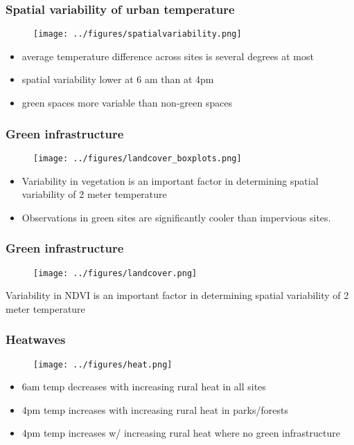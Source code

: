 \documentclass[aspectratio=169, 10pt]{beamer}
\begin{document}
\begin{frame}
\frametitle{Spatial variability of urban temperature}
\begin{figure}
\texttt{[image: ../figures/spatialvariability.png]}
\end{figure}
\begin{itemize}
\item average temperature difference across sites is several degrees at most
\item spatial variability lower at 6 am than at 4pm
\item green spaces more variable than non-green spaces 
\end{itemize}
\end{frame}

\begin{frame}
\frametitle{Green infrastructure}
\begin{figure}
\texttt{[image: ../figures/landcover\_boxplots.png]}
\end{figure}

\begin{itemize}
\item Variability in vegetation is an important factor in determining spatial variability of 2 meter temperature
\item Observations in green sites are significantly cooler than impervious sites.
\end{itemize}
\end{frame}

\begin{frame}
\frametitle{Green infrastructure}
\begin{figure}
\texttt{[image: ../figures/landcover.png]}
\end{figure}
Variability in NDVI is an important factor in determining spatial variability of 2 meter temperature
\end{frame}

\begin{frame}
\frametitle{Heatwaves}
\begin{figure}
\texttt{[image: ../figures/heat.png]}
\end{figure}
\begin{itemize}
\item 6am temp decreases with increasing rural heat in all sites
\item 4pm temp increases with increasing rural heat in parks/forests
\item 4pm temp increases w/ increasing rural heat  where no green infrastructure 
\end{itemize}
\end{frame}
\end{document}
